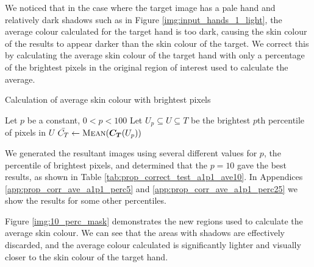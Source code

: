 We noticed that in the case where the target image has a pale hand and relatively dark shadows such as in Figure \ref{img:input_hands_1_light}, the average colour calculated for the target hand is too dark, causing the skin colour of the results to appear darker than the skin colour of the target. We correct this by calculating the average skin colour of the target hand with only a percentage of the brightest pixels in the original region of interest used to calculate the average. 

\begin{algorithm}[H]
\caption{Calculation of average skin colour with brightest pixels}
\label{eq:prop_corr_ave_algo}
\begin{algorithmic}
\State Let $p$ be a constant, $0 < p  < 100$
\State Let $U_p \subseteq U \subseteq T$ be the brightest $p$th percentile of pixels in $U$
\State $\mean{C_T} \gets \Call{Mean}{\vect{C_T}(U_p)}$
\end{algorithmic}
\end{algorithm}

We generated the resultant images using several different values for $p$, the percentile of brightest pixels, and determined that the $p = 10$ gave the best results, as shown in Table \ref{tab:prop_correct_test_a1p1_ave10}. In Appendices \ref{app:prop_corr_ave_a1p1_perc5} and \ref{app:prop_corr_ave_a1p1_perc25} we show the results for some other percentiles.



Figure \ref{img:10_perc_mask} demonstrates the new regions used to calculate the average skin colour. We can see that the areas with shadows are effectively discarded, and the average colour calculated is significantly lighter and visually closer to the skin colour of the target hand. 

